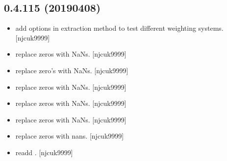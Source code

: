 \documentclass[a4paper,10pt,english]{report}
\begin{document}
\subsection{0.4.115 (2019\sphinxhyphen{}04\sphinxhyphen{}08)}
\label{\detokenize{misc/changelog:id165}}\begin{itemize}
\item {} 
 \sphinxhyphen{} add options in extraction method to test different
weighting systems. {[}njcuk9999{]}

\item {} 
 \sphinxhyphen{} replace zeros with NaNs. {[}njcuk9999{]}

\item {} 
 \sphinxhyphen{} replace zero’s with NaNs. {[}njcuk9999{]}

\item {} 
 \sphinxhyphen{} replace zeros with NaNs. {[}njcuk9999{]}

\item {} 
 \sphinxhyphen{} replace zeros with NaNs. {[}njcuk9999{]}

\item {} 
 \sphinxhyphen{} replace zeros with NaNs. {[}njcuk9999{]}

\item {} 
 \sphinxhyphen{} replace zeros with nans. {[}njcuk9999{]}

\item {} 
 \sphinxhyphen{} readd . {[}njcuk9999{]}

\end{itemize}
\end{document}
